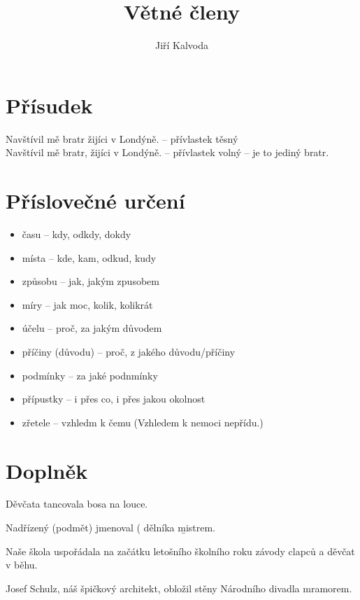 \documentclass[a4]{article}
\title{Větné členy}
\author{Jiří Kalvoda}
\begin{document}
\maketitle
\section{Přísudek}
Navštívil mě bratr žijíci v Londýně.
-- přívlastek těsný\\
Navštívil mě bratr, žijíci v Londýně.
-- přívlastek volný -- je to jediný bratr.

\section{Příslovečné určení}
\begin{itemize}
	\item času -- kdy, odkdy, dokdy
	\item místa -- kde, kam, odkud, kudy
	\item způsobu -- jak, jakým zpusobem
	\item míry -- jak moc, kolik, kolikrát
	\item účelu -- proč, za jakým důvodem
	\item příčiny (důvodu) -- proč, z jakého důvodu/příčiny
	\item podmínky -- za jaké podnmínky
	\item přípustky -- i přes co, i přes jakou okolnost
	\item zřetele -- vzhledm k čemu (Vzhledem k nemoci nepřídu.)
\end{itemize}


\section{Doplněk}
Děvčata tancovala bosa na louce.

Nadřízený (podmět) jmenoval ( dělníka \b{mistrem}.

Naše škola uspořádala na začátku letošního školního roku závody clapců a děvčat v běhu.

Josef Schulz, náš špičkový architekt, obložil stěny Národního divadla mramorem.
\end{document}
